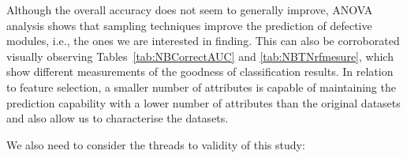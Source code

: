 \documentclass{elsart}
\begin{document}
%


Although the overall accuracy does not seem to generally improve, ANOVA analysis shows that sampling techniques improve the prediction of defective modules, i.e., the ones we are interested in finding. This can also be corroborated visually observing
Tables~\ref{tab:NBCorrectAUC} and \ref{tab:NBTNrfmesure}, which show different measurements of the goodness of classification results. In relation to feature selection, a smaller number of attributes is capable of maintaining the prediction capability with a lower number of attributes than the original datasets and also allow us to characterise the datasets.


We also need to consider the threads to validity \cite{fenton97,WohlinEtAl2000experimentation} of this study:
\end{document}
